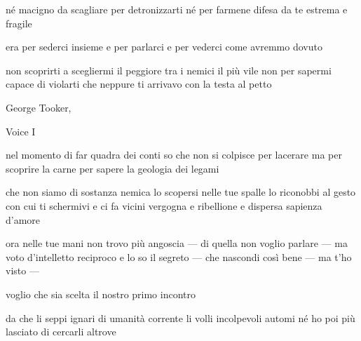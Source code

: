 \begin{poem}
	\begin{stanza}
		né macigno da scagliare\verseline
		per detronizzarti\verseline
		né per farmene\verseline
		difesa da te\verseline
		estrema e fragile
	\end{stanza}

	\begin{stanza}
		era per sederci\verseline
		insieme e per parlarci\verseline
		e per vederci\verseline
		come avremmo dovuto
	\end{stanza}

	\begin{stanza}
		non scoprirti a scegliermi\verseline
		il peggiore tra i nemici\verseline
		il più vile\verseline
		non per sapermi\verseline
		capace di violarti\verseline
		che neppure ti arrivavo\verseline
		con la testa al petto
	\end{stanza}
\end{poem}

\clearpage


\begin{artItem}
	George Tooker, \begin{otherlanguage}{english}%
		Voice I%
	\end{otherlanguage}
\end{artItem}

\begin{poem}
	\begin{stanza}
		nel momento di far quadra dei conti\verseline
		so che non si colpisce per lacerare\verseline
		ma per scoprire la carne\verseline
		per sapere la geologia dei legami
	\end{stanza}

	\begin{stanza}
		che non siamo di sostanza nemica\verseline
		lo scopersi nelle tue spalle\verseline
		lo riconobbi al gesto con cui ti schermivi\verseline
		e ci fa vicini vergogna e ribellione\verseline
		e dispersa sapienza d’amore
	\end{stanza}

	\begin{stanza}
		ora nelle tue mani non trovo più\verseline
		angoscia — di quella non voglio parlare —\verseline
		ma voto d’intelletto reciproco\verseline
		e lo so il segreto — che nascondi\verseline
		così bene — ma t'ho visto —
	\end{stanza}

	\begin{stanza}
		voglio che sia scelta\verseline
		il nostro primo incontro
	\end{stanza}
\end{poem}

\clearpage


\begin{poem}
	\begin{stanza}
		da che li seppi ignari\verseline
		di umanità corrente\verseline
		li volli incolpevoli automi\verseline
		né ho poi più lasciato\verseline
		di cercarli altrove
	\end{stanza}
\end{poem}
